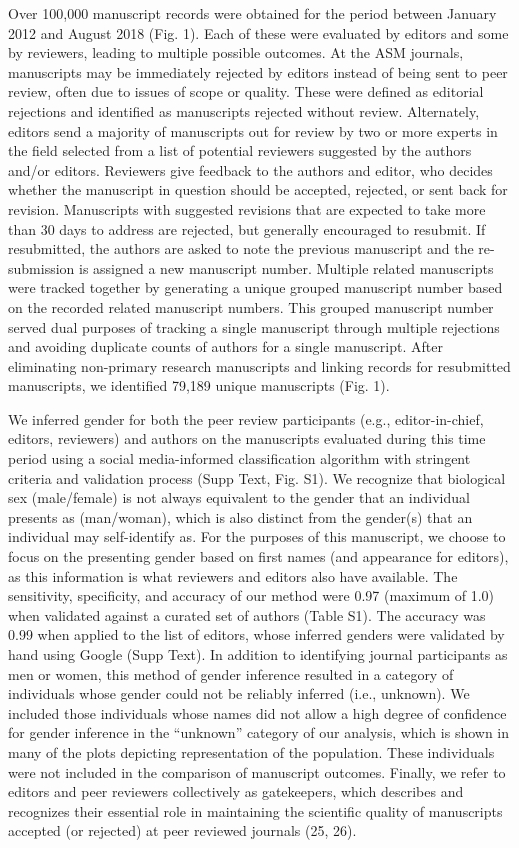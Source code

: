 \documentclass[11pt,]{article}
\begin{document}
Over 100,000 manuscript records were obtained for the period between
January 2012 and August 2018 (Fig. 1). Each of these were evaluated by
editors and some by reviewers, leading to multiple possible outcomes. At
the ASM journals, manuscripts may be immediately rejected by editors
instead of being sent to peer review, often due to issues of scope or
quality. These were defined as editorial rejections and identified as
manuscripts rejected without review. Alternately, editors send a
majority of manuscripts out for review by two or more experts in the
field selected from a list of potential reviewers suggested by the
authors and/or editors. Reviewers give feedback to the authors and
editor, who decides whether the manuscript in question should be
accepted, rejected, or sent back for revision. Manuscripts with
suggested revisions that are expected to take more than 30 days to
address are rejected, but generally encouraged to resubmit. If
resubmitted, the authors are asked to note the previous manuscript and
the re-submission is assigned a new manuscript number. Multiple related
manuscripts were tracked together by generating a unique grouped
manuscript number based on the recorded related manuscript numbers. This
grouped manuscript number served dual purposes of tracking a single
manuscript through multiple rejections and avoiding duplicate counts of
authors for a single manuscript. After eliminating non-primary research
manuscripts and linking records for resubmitted manuscripts, we
identified 79,189 unique manuscripts (Fig. 1).

We inferred gender for both the peer review participants (e.g.,
editor-in-chief, editors, reviewers) and authors on the manuscripts
evaluated during this time period using a social media-informed
classification algorithm with stringent criteria and validation process
(Supp Text, Fig. S1). We recognize that biological sex (male/female) is
not always equivalent to the gender that an individual presents as
(man/woman), which is also distinct from the gender(s) that an
individual may self-identify as. For the purposes of this manuscript, we
choose to focus on the presenting gender based on first names (and
appearance for editors), as this information is what reviewers and
editors also have available. The sensitivity, specificity, and accuracy
of our method were 0.97 (maximum of 1.0) when validated against a
curated set of authors (Table S1). The accuracy was 0.99 when applied to
the list of editors, whose inferred genders were validated by hand using
Google (Supp Text). In addition to identifying journal participants as
men or women, this method of gender inference resulted in a category of
individuals whose gender could not be reliably inferred (i.e., unknown).
We included those individuals whose names did not allow a high degree of
confidence for gender inference in the ``unknown'' category of our
analysis, which is shown in many of the plots depicting representation
of the population. These individuals were not included in the comparison
of manuscript outcomes. Finally, we refer to editors and peer reviewers
collectively as gatekeepers, which describes and recognizes their
essential role in maintaining the scientific quality of manuscripts
accepted (or rejected) at peer reviewed journals (25, 26).
\end{document}
